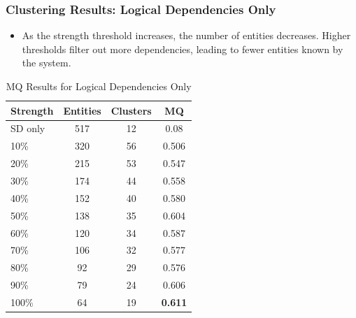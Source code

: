 \documentclass{beamer}
\begin{document}
\begin{frame}
\frametitle{Clustering Results: Logical Dependencies Only}
\begin{itemize}
    \item As the strength threshold increases, the number of entities decreases. Higher thresholds filter out more dependencies, leading to fewer entities known by the system.
\end{itemize}
\vspace{-0.5\baselineskip}
\begin{center}
    \begin{table}
    \centering
    \caption{MQ Results for Logical Dependencies Only}
    \begin{tabular}{lccc}
        \toprule
        \textbf{Strength} & \textbf{Entities} & \textbf{Clusters} & \textbf{MQ} \\
        \midrule
	SD only & 517 & 12 & 0.08 \\
	\hline
        10\% & 320 & 56 & 0.506 \\
        20\% & 215 & 53 & 0.547 \\
        30\% & 174 & 44 & 0.558 \\
        40\% & 152 & 40 & 0.580 \\
        50\% & 138 & 35 & 0.604 \\
        60\% & 120 & 34 & 0.587 \\
        70\% & 106 & 32 & 0.577 \\
        80\% & 92 & 29 & 0.576 \\
        90\% & 79 & 24 & 0.606 \\
        \rowcolor{yellow} 100\% & 64 & 19 & \textbf{0.611} \\
        \bottomrule
    \end{tabular}
    \end{table}
\end{center}
\end{frame}
\end{document}
